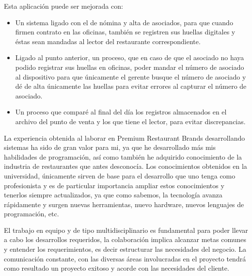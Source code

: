 Esta aplicación puede ser mejorada con:

\begin{itemize}
 \item Un sistema ligado con el de nómina y alta de asociados, para que cuando firmen contrato en las oficinas, también se registren sus huellas digitales y éstas sean mandadas al lector del restaurante correspondiente.
 \item Ligado al punto anterior, un proceso, que en caso de que el asociado no haya podido registrar sus huellas en oficinas, poder mandar el número de asociado al dispositivo para que únicamente el gerente busque el número de asociado y dé de alta únicamente las huellas para evitar errores al capturar el número de asociado.
 \item Un proceso que comparé al final del día los registros almacenados en el archivo del punto de venta y los que tiene el lector, para evitar discrepancias. 
\end{itemize}


La experiencia obtenida al laborar en Premium Restaurant Brands desarrollando sistemas ha sido de gran valor para mi, ya que he desarrollado más mis habilidades de programación, así como también he adquirido conocimiento de la industria de restaurantes que antes desconocía. Los conocimientos obtenidos en la universidad, únicamente sirven de base para el desarrollo que uno tenga como profesionista y es de particular importancia ampliar estos conocimientos y tenerlos siempre actualizados, ya que como sabemos, la tecnología avanza rápidamente y surgen nuevas herramientas, nuevo hardware, nuevos lenguajes de programación, etc.

El trabajo en equipo y de tipo multidisciplinario es fundamental para poder llevar a cabo los desarrollos requeridos, la colaboración implica alcanzar metas comunes y entender los requerimientos, es decir estructurar las necesidades del negocio. La comunicación constante, con las diversas áreas involucradas en el proyecto tendrá como resultado un proyecto exitoso y acorde con las necesidades del cliente.

